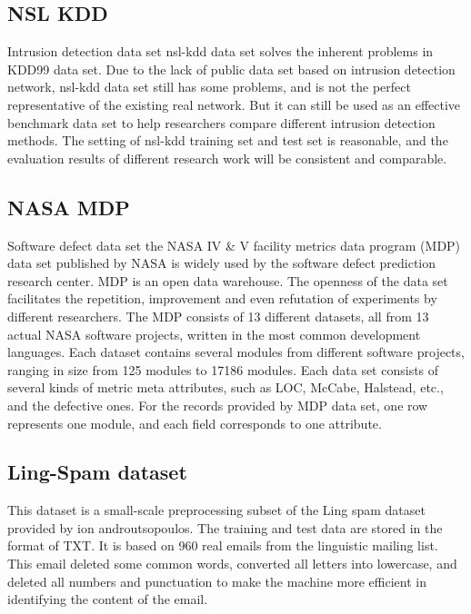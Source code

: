 \documentclass[UTF8]{article}
\begin{document}
\subsection{NSL KDD}
	Intrusion detection data set nsl-kdd data set solves the inherent problems in KDD99 data set. Due to the lack of public data set based on intrusion detection network, nsl-kdd data set still has some problems, and is not the perfect representative of the existing real network. But it can still be used as an effective benchmark data set to help researchers compare different intrusion detection methods. The setting of nsl-kdd training set and test set is reasonable, and the evaluation results of different research work will be consistent and comparable.
	

\subsection{NASA MDP}
	
	Software defect data set the NASA IV \& V facility metrics data program (MDP) data set published by NASA is widely used by the software defect prediction research center. MDP is an open data warehouse. The openness of the data set facilitates the repetition, improvement and even refutation of experiments by different researchers. The MDP consists of 13 different datasets, all from 13 actual NASA software projects, written in the most common development languages. Each dataset contains several modules from different software projects, ranging in size from 125 modules to 17186 modules. Each data set consists of several kinds of metric meta attributes, such as LOC, McCabe, Halstead, etc., and the defective ones. For the records provided by MDP data set, one row represents one module, and each field corresponds to one attribute.
	
	
\subsection{Ling-Spam dataset \cite{18}
\cite{19}}

This dataset is a small-scale preprocessing subset of the Ling spam dataset provided by ion androutsopoulos. The training and test data are stored in the format of TXT. It is based on 960 real emails from the linguistic mailing list. This email deleted some common words, converted all letters into lowercase, and deleted all numbers and punctuation to make the machine more efficient in identifying the content of the email.
\end{document}

